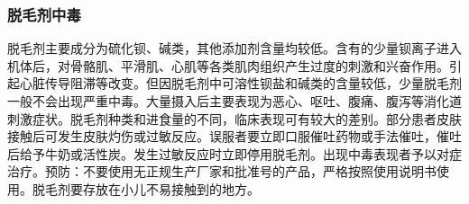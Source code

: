 \subsubsection{脱毛剂中毒}

脱毛剂主要成分为硫化钡、碱类，其他添加剂含量均较低。含有的少量钡离子进入机体后，对骨骼肌、平滑肌、心肌等各类肌肉组织产生过度的刺激和兴奋作用。引起心脏传导阻滞等改变。但因脱毛剂中可溶性钡盐和碱类的含量较低，少量脱毛剂一般不会出现严重中毒。大量摄入后主要表现为恶心、呕吐、腹痛、腹泻等消化道刺激症状。脱毛剂种类和进食量的不同，临床表现可有较大的差别。部分患者皮肤接触后可发生皮肤灼伤或过敏反应。误服者要立即口服催吐药物或手法催吐，催吐后给予牛奶或活性炭。发生过敏反应时立即停用脱毛剂。出现中毒表现者予以对症治疗。预防：不要使用无正规生产厂家和批准号的产品，严格按照使用说明书使用。脱毛剂要存放在小儿不易接触到的地方。

\protect\hypertarget{text00190.html}{}{}

